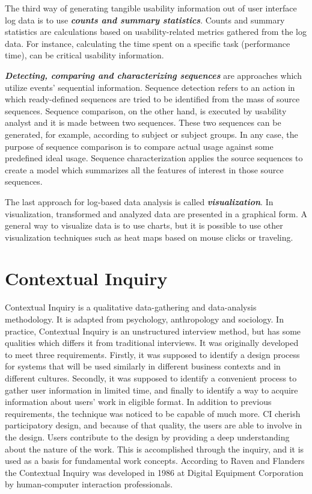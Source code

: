 \documentclass[12pt,a4paper,oneside,pdftex]{report}
\begin{document}
The third way of generating tangible usability information out of user interface log data is to use \textbf{\emph{counts and summary statistics}}. Counts and summary statistics are calculations based on usability-related metrics gathered from the log data. For instance, calculating the time spent on a specific task (performance time), can be critical usability information. \citep{RefWorks:24, RefWorks:25}

\textbf{\emph{Detecting, comparing and characterizing sequences}} are approaches which utilize events' sequential information. Sequence detection refers to an action in which ready-defined sequences are tried to be identified from the mass of source sequences. Sequence comparison, on the other hand, is  executed by usability analyst and it is made between two sequences. These two sequences can be generated, for example, according to subject or subject groups. In any case, the purpose of sequence comparison is to compare actual usage against some predefined ideal usage. Sequence characterization applies the source sequences to create a model which summarizes all the features of interest in those source sequences. \citep{RefWorks:24, RefWorks:25}
 
The last approach for log-based data analysis is called \textbf{\emph{visualization}}. In visualization, transformed and analyzed data are  presented in a graphical form. A general way to visualize data is to use charts, but it is possible to use other visualization techniques such as heat maps based on mouse clicks or traveling. \citep{RefWorks:24, RefWorks:25}

\section{Contextual Inquiry}
\label{sec:cinquiry}
Contextual Inquiry is a qualitative data-gathering and data-analysis methodology. It is adapted from psychology, anthropology and sociology. \citep{RefWorks:28} In practice, Contextual Inquiry is an unstructured interview method, but has some qualities which differs it from traditional interviews.\citep{RefWorks:23}  It was originally developed to meet three requirements. Firstly, it was supposed to identify a design process for systems that will be used similarly in different business contexts and in different cultures. Secondly, it was supposed to identify a convenient process to gather user information in limited time, and finally to identify a way to acquire information about users' work in eligible format. In addition to previous requirements, the technique was noticed to be capable of much more. CI cherish participatory design, and because of that quality, the users are able to involve in the design. Users contribute to the design by providing a deep understanding about the nature of the work. This is accomplished through the inquiry, and it is used as a basis for fundamental work concepts. \citep{RefWorks:14} According to Raven and Flanders \citep{RefWorks:28} the Contextual Inquiry was developed in 1986 at Digital Equipment Corporation by human-computer interaction professionals. \citep{RefWorks:28} 
\end{document}
